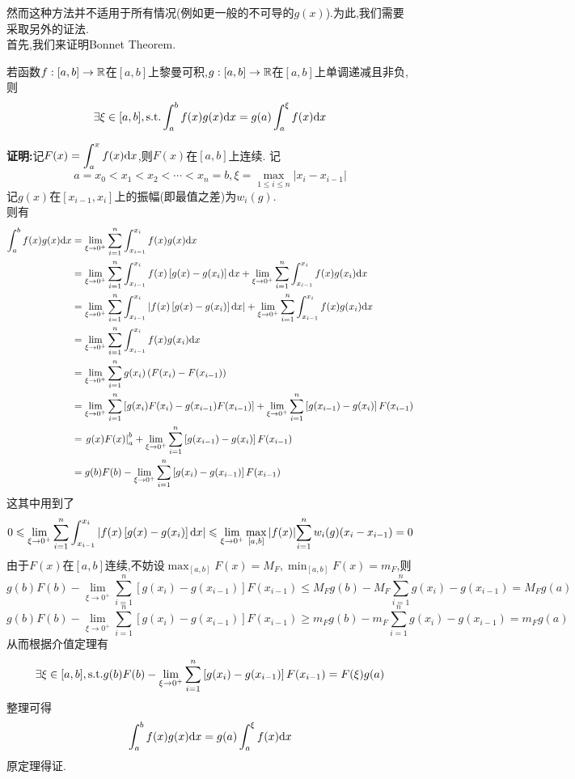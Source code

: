 \documentclass{ctexart}
\begin{document}
然而这种方法并不适用于所有情况(例如更一般的不可导的$g(x)$).为此,我们需要采取另外的证法.\\
首先,我们来证明Bonnet Theorem.
\begin{formal}
    若函数$f:[a,b]\to\mathbb{R}$在$[a,b]$上黎曼可积,$g:[a,b]\to\mathbb{R}$在$[a,b]$上单调递减且非负,则
    $$\exists\xi\in[a,b],\text{s.t.}\int_{a}^{b}{f(x)g(x)\mathrm{d} x}=g(a)\int_{a}^{\xi}{f(x)\mathrm{d} x}$$
\end{formal}
\begin{solution}[Proof.]
    \textbf{证明:}记$\displaystyle F(x)=\int_{a}^{x}{f(x)\mathrm{d} x}$,则$F(x)$在$[a,b]$上连续.
    记$$a=x_0<x_1<x_2<\cdots<x_n=b,\xi=\max_{1\leqslant i\leqslant n}{\left|x_i-x_{i-1}\right|}$$
    记$g(x)$在$[x_{i-1},x_i]$上的振幅(即最值之差)为$w_i(g)$.\\
    则有
    $$\begin{aligned}
        \int_{a}^{b}{f(x)g(x)\mathrm{d} x}
        &= \lim_{\xi\to 0^+}{\sum_{i=1}^{n}{\int_{x_{i-1}}^{x_i}{f(x)g(x)\mathrm{d} x}}} \\
        &= \lim_{\xi\to 0^+}{\sum_{i=1}^{n}{\int_{x_{i-1}}^{x_i}{f(x)\left[g(x)-g(x_i)\right]\mathrm{d} x}}}+\lim_{\xi\to 0^+}{\sum_{i=1}^{n}{\int_{x_{i-1}}^{x_i}{f(x)g(x_i)\mathrm{d} x}}} \\
        &= \lim_{\xi\to 0^+}{\sum_{i=1}^{n}{\int_{x_{i-1}}^{x_i}{\left|f(x)\left[g(x)-g(x_i)\right]\mathrm{d} x\right|}}}+\lim_{\xi\to 0^+}{\sum_{i=1}^{n}{\int_{x_{i-1}}^{x_i}{f(x)g(x_i)\mathrm{d} x}}} \\
        &= \lim_{\xi\to 0^+}{\sum_{i=1}^{n}{\int_{x_{i-1}}^{x_i}{f(x)g(x_i)\mathrm{d} x}}} \\
        &= \lim_{\xi\to 0^+}{\sum_{i=1}^{n}{g(x_i)\left(F(x_i)-F(x_{i-1})\right)}} \\
        &= \lim_{\xi\to 0^+}{\sum_{i=1}^{n}\left[g(x_i)F(x_i)-g(x_{i-1})F(x_{i-1})\right]}+\lim_{\xi\to 0^+}{\sum_{i=1}^{n}\left[g(x_{i-1})-g(x_i)\right]F(x_{i-1})} \\
        &= \left.g(x)F(x)\right|_a^b+\lim_{\xi\to 0^+}{\sum_{i=1}^{n}\left[g(x_{i-1})-g(x_i)\right]F(x_{i-1})} \\
        &= g(b)F(b)-\lim_{\xi\to 0^+}{\sum_{i=1}^{n}\left[g(x_{i})-g(x_{i-1})\right]F(x_{i-1})}
    \end{aligned}$$
    这其中用到了
    $$0\leqslant \lim_{\xi\to 0^+}{\sum_{i=1}^{n}{\int_{x_{i-1}}^{x_i}{\left|f(x)\left[g(x)-g(x_i)\right]\mathrm{d} x\right|}}}\leqslant \lim_{\xi\to 0^+}\max_{[a,b]}{\left|f(x)\right|}{\sum_{i=1}^{n}{w_i(g)(x_i-x_{i-1})}}=0$$
    由于$F(x)$在$[a,b]$连续,不妨设$\displaystyle\max_{[a,b]}F(x)=M_F,\min_{[a,b]}F(x)=m_F$,则
    $$g(b)F(b)-\lim_{\xi\to 0^+}{\sum_{i=1}^{n}\left[g(x_{i})-g(x_{i-1})\right]F(x_{i-1})}\leqslant M_Fg(b)-M_F\sum_{i=1}^{n}{g(x_i)-g(x_{i-1})}=M_Fg(a)$$
    $$g(b)F(b)-\lim_{\xi\to 0^+}{\sum_{i=1}^{n}\left[g(x_{i})-g(x_{i-1})\right]F(x_{i-1})}\geqslant m_Fg(b)-m_F\sum_{i=1}^{n}{g(x_i)-g(x_{i-1})}=m_Fg(a)$$
    从而根据介值定理有
    $$\displaystyle\exists\xi\in[a,b],\text{s.t.} g(b)F(b)-\lim_{\xi\to 0^+}{\sum_{i=1}^{n}\left[g(x_{i})-g(x_{i-1})\right]F(x_{i-1})}=F(\xi)g(a)$$
    整理可得$$\int_{a}^{b}{f(x)g(x)\mathrm{d} x}=g(a)\int_{a}^{\xi}{f(x)\mathrm{d} x}$$
    原定理得证.
\end{solution}\noindent
\end{document}
